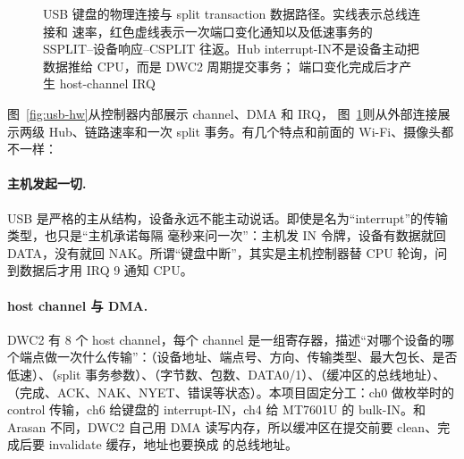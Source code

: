 \begin{figure}[htbp]
{
  }
  \caption{USB 键盘的物理连接与 split transaction 数据路径。实线表示总线连接和
  速率，红色虚线表示一次端口变化通知以及低速事务的 SSPLIT--设备响应--CSPLIT
  往返。Hub interrupt-IN不是设备主动把数据推给 CPU，而是 DWC2 周期提交事务；
  端口变化完成后才产生 host-channel IRQ}
  \label{fig:usb-kbd-topology}
\end{figure}

图~\ref{fig:usb-hw}从控制器内部展示 channel、DMA 和 IRQ，
图~\ref{fig:usb-kbd-topology}则从外部连接展示两级 Hub、链路速率和一次 split
事务。有几个特点和前面的 Wi-Fi、摄像头都不一样：

\paragraph{主机发起一切.} USB 是严格的主从结构，设备永远不能主动说话。即使是名为“interrupt”的传输类型，也只是“主机承诺每隔  毫秒来问一次”：主机发 IN 令牌，设备有数据就回 DATA，没有就回 NAK。所谓“键盘中断”，其实是主机控制器替 CPU 轮询，问到数据后才用 IRQ 9 通知 CPU。

\paragraph{host channel 与 DMA.} DWC2 有 8 个 host channel，每个 channel 是一组寄存器，描述“对哪个设备的哪个端点做一次什么传输”：（设备地址、端点号、方向、传输类型、最大包长、是否低速）、（split 事务参数）、（字节数、包数、DATA0/1）、（缓冲区的总线地址）、（完成、ACK、NAK、NYET、错误等状态）。本项目固定分工：ch0 做枚举时的 control 传输，ch6 给键盘的 interrupt-IN，ch4 给 MT7601U 的 bulk-IN。和 Arasan 不同，DWC2 自己用 DMA 读写内存，所以缓冲区在提交前要 clean、完成后要 invalidate 缓存，地址也要换成  的总线地址。

